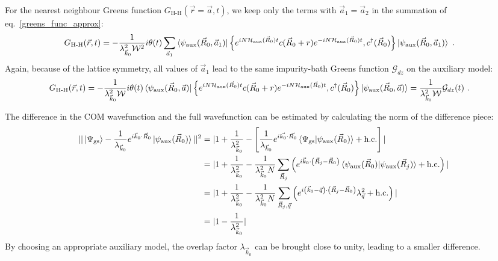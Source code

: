 \documentclass{report}
\numberwithin{equation}{section}
\begin{document}
For the nearest neighbour Greens function \(G_\text{H-H}(\vec r=\vec a, t)\), we keep only the terms with \(\vec a_1 = \vec a_2\) in the summation of eq.~\ref{greens_func_approx}:
\begin{equation}\begin{aligned}
	G_\text{H-H}(\vec r, t) &= -\frac{1}{\lambda_{\vec k_0}^2 \mathcal{W}^2}i\theta(t) \sum_{\vec a_1}\braket{\psi_\text{aux}(\vec R_0, \vec a_1) | \left\{ e^{i N \mathcal{H}_\text{aux}(\vec R_0) t}c(\vec R_0 + r)e^{-i N \mathcal{H}_\text{aux}(\vec R_0) t}, c^\dagger(\vec R_0) \right\} | \psi_\text{aux}(\vec R_0, \vec a_1)}~.
\end{aligned}\end{equation}
Again, because of the lattice symmetry, all values of \(\vec a_1\) lead to the same impurity-bath Greens function \(\mathcal{G}_{dz}\) on the auxiliary model:
\begin{equation}\begin{aligned}
	G_\text{H-H}(\vec r, t) &= -\frac{1}{\lambda_{\vec k_0}^2 \mathcal{W}}i\theta(t) \braket{\psi_\text{aux}(\vec R_0, \vec a) | \left\{ e^{i N \mathcal{H}_\text{aux}(\vec R_0) t}c(\vec R_0 + r)e^{-i N \mathcal{H}_\text{aux}(\vec R_0) t}, c^\dagger(\vec R_0) \right\} | \psi_\text{aux}(\vec R_0, \vec a)} = \frac{1}{\lambda_{\vec k_0}^2 \mathcal{W}} \mathcal{G}_{dz}(t)~.
\end{aligned}\end{equation}


The difference in the COM wavefunction and the full wavefunction can be estimated by calculating the norm of the difference piece:
\begin{equation}\begin{aligned}
	||\ket{\Psi_\text{gs}} - \frac{1}{\lambda_{\vec k_0}} e^{i\vec{k}_0\cdot\vec{R}_0} \ket{\psi_\text{aux}(\vec R_0)}||^2 &= |1 + \frac{1}{\lambda_{\vec k_0}^2} - \left[\frac{1}{\lambda_{\vec k_0}}e^{i \vec{k_0}\cdot\vec{R_0}}\braket{\Psi_\text{gs} | \psi_\text{aux}(\vec R_0)} + \text{h.c.}\right]| \\
	&=|1 + \frac{1}{\lambda_{\vec k_0}^2} - \frac{1}{\lambda_{\vec k_0}^2 N}\sum_{\vec R_j} \left(e^{i \vec k_0 \cdot \left( \vec R_j - \vec R_0 \right)}  \braket{\psi_\text{aux}(\vec R_0) | \psi_\text{aux}(\vec R_j) } + \text{h.c.}\right)|\\
	&=|1 + \frac{1}{\lambda_{\vec k_0}^2} - \frac{1}{\lambda_{\vec k_0}^2 N}\sum_{\vec R_j,\vec q} \left(e^{i \left(\vec k_0 - \vec q\right)\cdot \left( \vec R_j - \vec R_0 \right)}\lambda_{\vec q}^2 + \text{h.c.}\right)|\\
	&= |1 - \frac{1}{\lambda_{\vec k_0}^2}|
\end{aligned}\end{equation}
By choosing an appropriate auxiliary model, the overlap factor \(\lambda_{\vec k_0}\) can be brought close to unity, leading to a smaller difference.
\end{document}
